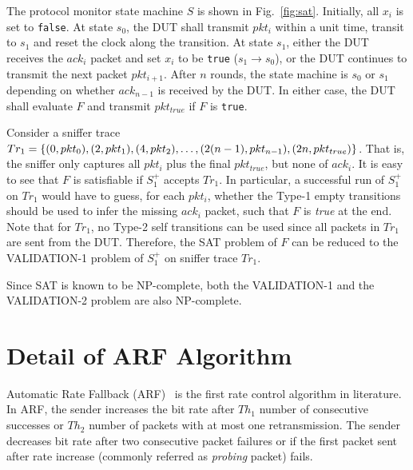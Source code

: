 The protocol monitor state machine $S$ is shown in Fig.~\ref{fig:sat}.
Initially, all $x_i$ is set to \texttt{false}.
At state $s_0$, the DUT shall transmit $pkt_i$ within a unit time, transit to
$s_1$ and reset the clock along the transition.
At state $s_1$, either the DUT receives the $ack_i$ packet and
set $x_i$ to be \texttt{true} ($s_1 \rightarrow s_0$), or the DUT continues to
transmit the next packet $pkt_{i+1}$.
After $n$ rounds, the state machine is $s_0$ or $s_1$ depending on whether
$ack_{n-1}$ is received by the DUT.
In either case, the DUT shall evaluate $F$ and transmit $pkt_{true}$ if $F$ is
\texttt{true}.  

Consider a sniffer trace $Tr_1=\{(0, pkt_0), (2, pkt_1),\\ (4,
pkt_2),\ldots, (2(n-1), pkt_{n-1}), (2n, pkt_{true})\}$.
That is, the sniffer only captures all $pkt_i$ plus the final $pkt_{true}$, but none of
$ack_i$.
It is easy to see that $F$ is satisfiable if $S_1^+$ accepts
$Tr_1$.
In particular, a successful run of $S_1^+$ on $Tr_1$ would have to
guess, for each $pkt_i$, whether the Type-1 empty transitions should be used
to infer the missing $ack_i$ packet, such that $F$ is \textit{true} at the
end.
Note that for $Tr_1$, no Type-2 self transitions can be used since all
packets in $Tr_1$ are sent from the DUT.
Therefore, the SAT problem of $F$ can be reduced to the VALIDATION-1 problem
of $S^+_1$ on sniffer trace $Tr_1$.


Since SAT is known to be NP-complete, both the VALIDATION-1 and the
VALIDATION-2 problem are also NP-complete.

\section{Detail of ARF Algorithm}
\label{app:arf}
Automatic Rate Fallback (ARF)~\cite{kamerman1997wavelan} is the first rate
control algorithm in literature. In ARF, the sender increases the bit rate after
$Th_1$ number of consecutive successes or $Th_2$ number of packets with at most
one retransmission. The sender decreases bit rate after two consecutive packet
failures or if the first packet sent after rate increase (commonly referred as
\textit{probing} packet) fails.

